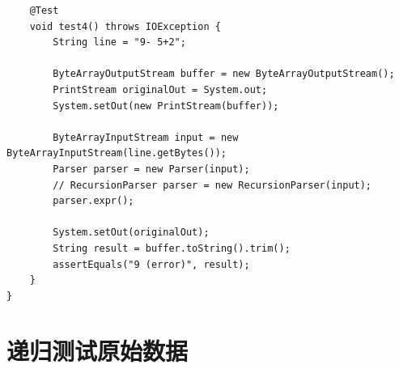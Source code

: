 \documentclass[a4paper, twoside, utf8]{ctexart}
\begin{document}
\begin{verbatim}
    @Test
    void test4() throws IOException {
        String line = "9- 5+2";

        ByteArrayOutputStream buffer = new ByteArrayOutputStream();
        PrintStream originalOut = System.out;
        System.setOut(new PrintStream(buffer));

        ByteArrayInputStream input = new ByteArrayInputStream(line.getBytes());
        Parser parser = new Parser(input);
        // RecursionParser parser = new RecursionParser(input);
        parser.expr();

        System.setOut(originalOut);
        String result = buffer.toString().trim();
        assertEquals("9 (error)", result);
    }
}
    \end{verbatim}

    \section{递归测试原始数据}
\end{document}
